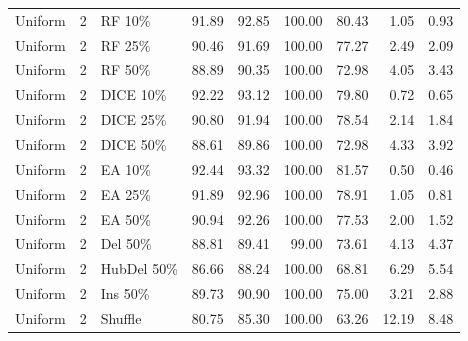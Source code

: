 {\begin{longtable}{rllrrrrrr}
Uniform & 2 & RF 10\% & 91.89 & 92.85 & 100.00 & 80.43 & 1.05 & 0.93 \\
Uniform & 2 & RF 25\% & 90.46 & 91.69 & 100.00 & 77.27 & 2.49 & 2.09 \\
Uniform & 2 & RF 50\% & 88.89 & 90.35 & 100.00 & 72.98 & 4.05 & 3.43 \\
Uniform & 2 & DICE 10\% & 92.22 & 93.12 & 100.00 & 79.80 & 0.72 & 0.65 \\
Uniform & 2 & DICE 25\% & 90.80 & 91.94 & 100.00 & 78.54 & 2.14 & 1.84 \\
Uniform & 2 & DICE 50\% & 88.61 & 89.86 & 100.00 & 72.98 & 4.33 & 3.92 \\
Uniform & 2 & EA 10\% & 92.44 & 93.32 & 100.00 & 81.57 & 0.50 & 0.46 \\
Uniform & 2 & EA 25\% & 91.89 & 92.96 & 100.00 & 78.91 & 1.05 & 0.81 \\
Uniform & 2 & EA 50\% & 90.94 & 92.26 & 100.00 & 77.53 & 2.00 & 1.52 \\
Uniform & 2 & Del 50\% & 88.81 & 89.41 & 99.00 & 73.61 & 4.13 & 4.37 \\
Uniform & 2 & HubDel 50\% & 86.66 & 88.24 & 100.00 & 68.81 & 6.29 & 5.54 \\
Uniform & 2 & Ins 50\% & 89.73 & 90.90 & 100.00 & 75.00 & 3.21 & 2.88 \\
Uniform & 2 & Shuffle & 80.75 & 85.30 & 100.00 & 63.26 & 12.19 & 8.48 \\
\end{longtable}
}

